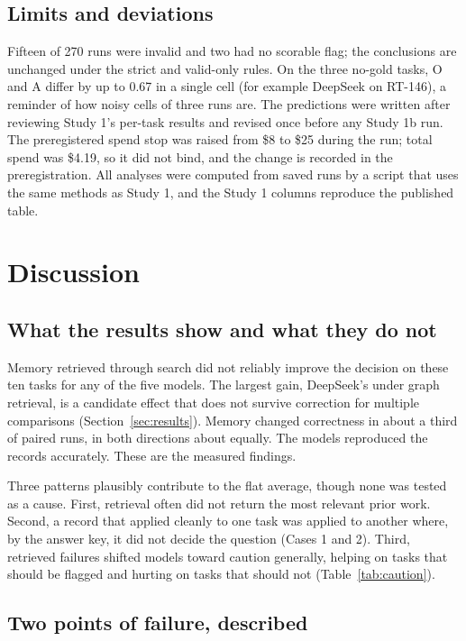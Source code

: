 \documentclass[11pt]{article}
\begin{document}
\subsection{Limits and deviations}

Fifteen of 270 runs were invalid and two had no scorable flag; the conclusions are unchanged under the strict and valid-only rules. On the three no-gold tasks, O and A differ by up to 0.67 in a single cell (for example DeepSeek on RT-146), a reminder of how noisy cells of three runs are. The predictions were written after reviewing Study 1's per-task results and revised once before any Study 1b run. The preregistered spend stop was raised from \$8 to \$25 during the run; total spend was \$4.19, so it did not bind, and the change is recorded in the preregistration. All analyses were computed from saved runs by a script that uses the same methods as Study 1, and the Study 1 columns reproduce the published table.

\section{Discussion}
\label{sec:discussion}

\subsection{What the results show and what they do not}

Memory retrieved through search did not reliably improve the decision on these ten tasks for any of the five models. The largest gain, DeepSeek's under graph retrieval, is a candidate effect that does not survive correction for multiple comparisons (Section~\ref{sec:results}). Memory changed correctness in about a third of paired runs, in both directions about equally. The models reproduced the records accurately. These are the measured findings.

Three patterns plausibly contribute to the flat average, though none was tested as a cause. First, retrieval often did not return the most relevant prior work. Second, a record that applied cleanly to one task was applied to another where, by the answer key, it did not decide the question (Cases 1 and 2). Third, retrieved failures shifted models toward caution generally, helping on tasks that should be flagged and hurting on tasks that should not (Table~\ref{tab:caution}).

\subsection{Two points of failure, described}
\end{document}
